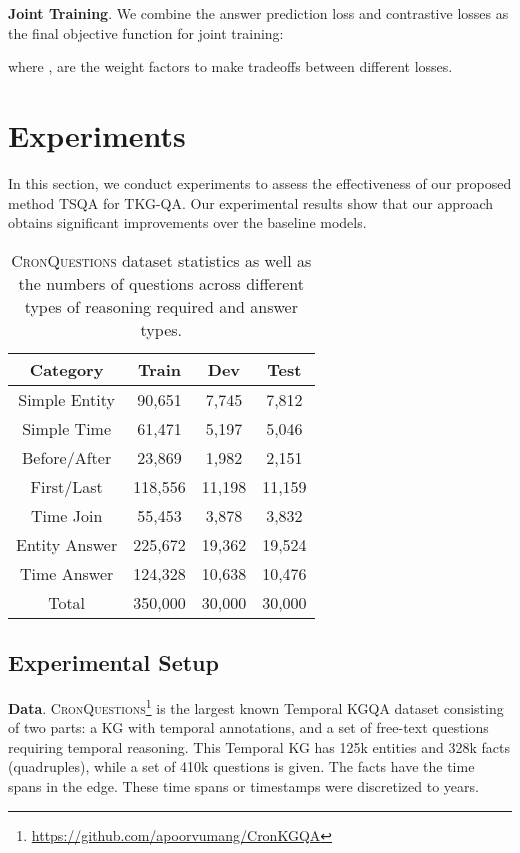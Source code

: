 \documentclass[11pt]{article}
\newcommand{\xhdr}[1]{{\noindent\bfseries #1}.}
\begin{document}
\xhdr{Joint Training} We combine the answer prediction loss and contrastive losses as the final objective function for joint training:

where ,  are the weight factors to make tradeoffs between different losses.




\section{Experiments}
In this section, we conduct experiments to assess the effectiveness of our proposed method TSQA for TKG-QA. 
Our experimental results show that our approach obtains significant improvements over the baseline models.

\begin{table}[!ht]
    \centering 
    \small
    \begin{tabular}{c|c|c|c}
    \hline
    Category & Train & Dev &  Test \\ \hline \hline
    Simple Entity & 90,651 & 7,745 & 7,812 \\ 
    Simple Time & 61,471 & 5,197 & 5,046 \\ 
    Before/After & 23,869 & 1,982 & 2,151\\ 
    First/Last& 118,556& 11,198& 11,159\\ 
    Time Join& 55,453& 3,878& 3,832\\ 
    \hline  
    Entity Answer & 225,672&  19,362&  19,524\\ 
    Time Answer&  124,328&  10,638&  10,476\\ 
    \hline 
    Total&  350,000&  30,000&  30,000\\ 
    \hline 
    \end{tabular}
    \caption{\textsc{CronQuestions} dataset statistics as well as the numbers of questions across different types of reasoning required and answer types.}
    \label{DatasetStats}
\end{table}

\subsection{Experimental Setup}

\xhdr{Data} \textsc{CronQuestions}\footnote{\url{https://github.com/apoorvumang/CronKGQA}} is the largest known Temporal KGQA dataset consisting of two parts: a KG with temporal annotations, and a set of free-text questions requiring temporal reasoning. This Temporal KG has 125k entities and 328k facts (quadruples), while a set of 410k questions is given. The facts have the time spans in the edge. These time spans or timestamps were discretized to years.
\end{document}

